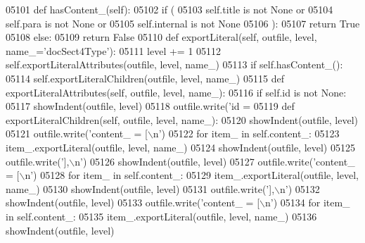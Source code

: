 \begin{DoxyCode}
{{{{{{{{{{{{{{{{{{{{{{{{{{{{{{{{{{{{{{{{{{{{{{{{{{{{{{{{{{{{{{{{{{{{{{{{{{{{{{{{{{{{{{{{{{{{{{{{{{{{{{{{{{{{{{{{{{{{{{{{{{{{{{{{{{{{{{{{{{{{{{{{{{{{{{{{{{{{{{{{{{{{{{{{{{{{{{{{{{{{{{{{{{{{{{{{{{{{{{{{{{{{{{{{{{{{{{{{{{{{{{{{{{{{{{{{{{{{{{{{{{{{{{{{{{{{{{{{{{{{{{{{{{{{{{{{{{{{{{{{{{{{{{{{{{{{{{{{{{{{{{{{{{{{{{{{{{{{{{{{{{{{{{{{{{{{{{{05101     \textcolor{keyword}{def }hasContent_(self):
05102         \textcolor{keywordflow}{if} (
05103             self.title \textcolor{keywordflow}{is} \textcolor{keywordflow}{not} \textcolor{keywordtype}{None} \textcolor{keywordflow}{or}
05104             self.para \textcolor{keywordflow}{is} \textcolor{keywordflow}{not} \textcolor{keywordtype}{None} \textcolor{keywordflow}{or}
05105             self.internal \textcolor{keywordflow}{is} \textcolor{keywordflow}{not} \textcolor{keywordtype}{None}
05106             ):
05107             \textcolor{keywordflow}{return} \textcolor{keyword}{True}
05108         \textcolor{keywordflow}{else}:
05109             \textcolor{keywordflow}{return} \textcolor{keyword}{False}
05110     \textcolor{keyword}{def }exportLiteral(self, outfile, level, name\_='docSect4Type'):
05111         level += 1
05112         self.exportLiteralAttributes(outfile, level, name\_)
05113         \textcolor{keywordflow}{if} self.hasContent_():
05114             self.exportLiteralChildren(outfile, level, name\_)
05115     \textcolor{keyword}{def }exportLiteralAttributes(self, outfile, level, name\_):
05116         \textcolor{keywordflow}{if} self.id \textcolor{keywordflow}{is} \textcolor{keywordflow}{not} \textcolor{keywordtype}{None}:
05117             showIndent(outfile, level)
05118             outfile.write(\textcolor{stringliteral}{'id = %
05119     \textcolor{keyword}{def }exportLiteralChildren(self, outfile, level, name\_):
05120         showIndent(outfile, level)
05121         outfile.write(\textcolor{stringliteral}{'content\_ = [\(\backslash\)n'})
05122         \textcolor{keywordflow}{for} item\_ \textcolor{keywordflow}{in} self.content_:
05123             item\_.exportLiteral(outfile, level, name\_)
05124         showIndent(outfile, level)
05125         outfile.write(\textcolor{stringliteral}{'],\(\backslash\)n'})
05126         showIndent(outfile, level)
05127         outfile.write(\textcolor{stringliteral}{'content\_ = [\(\backslash\)n'})
05128         \textcolor{keywordflow}{for} item\_ \textcolor{keywordflow}{in} self.content_:
05129             item\_.exportLiteral(outfile, level, name\_)
05130         showIndent(outfile, level)
05131         outfile.write(\textcolor{stringliteral}{'],\(\backslash\)n'})
05132         showIndent(outfile, level)
05133         outfile.write(\textcolor{stringliteral}{'content\_ = [\(\backslash\)n'})
05134         \textcolor{keywordflow}{for} item\_ \textcolor{keywordflow}{in} self.content_:
05135             item\_.exportLiteral(outfile, level, name\_)
05136         showIndent(outfile, level)
}}}}}}}}}}}}}}}}}}}}}}}}}}}}}}}}}}}}}}}}}}}}}}}}}}}}}}}}}}}}}}}}}}}}}}}}}}}}}}}}}}}}}}}}}}}}}}}}}}}}}}}}}}}}}}}}}}}}}}}}}}}}}}}}}}}}}}}}}}}}}}}}}}}}}}}}}}}}}}}}}}}}}}}}}}}}}}}}}}}}}}}}}}}}}}}}}}}}}}}}}}}}}}}}}}}}}}}}}}}}}}}}}}}}}}}}}}}}}}}}}}}}}}}}}}}}}}}}}}}}}}}}}}}}}}}}}}}}}}}}}}}}}}}}}}}}}}}}}}}}}}}}}}}}}}}}}}}}}}}}}}}}}}}}}}}}}}}}
\end{DoxyCode}

